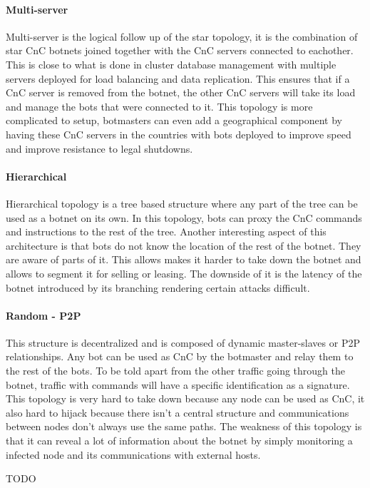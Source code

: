 \paragraph{Multi-server}
Multi-server is the logical follow up of the star topology, it is the combination of star CnC botnets joined together with the CnC servers connected to eachother. This is close to what is done in cluster database management with multiple servers deployed for load balancing and data replication. This ensures that if a CnC server is removed from the botnet, the other CnC servers will take its load and manage the bots that were connected to it. This topology is more complicated to setup, botmasters can even add a geographical component by having these CnC servers in the countries with bots deployed to improve speed and improve resistance to legal shutdowns.

\paragraph{Hierarchical}
Hierarchical topology is a tree based structure where any part of the tree can be used as a botnet on its own. In this topology, bots can proxy the CnC commands and instructions to the rest of the tree. Another interesting aspect of this architecture is that bots do not know the location of the rest of the botnet. They are aware of parts of it. This allows makes it harder to take down the botnet and allows to segment it for selling or leasing. The downside of it is the latency of the botnet introduced by its branching rendering certain attacks difficult.

\paragraph{Random - P2P}
This structure is decentralized and is composed of dynamic master-slaves or P2P relationships. Any bot can be used as CnC by the botmaster and relay them to the rest of the bots. To be told apart from the other traffic going through the botnet, traffic with commands will have a specific identification as a signature. This topology is very hard to take down because any node can be used as CnC, it also hard to hijack because there isn't a central structure and communications between nodes don't always use the same paths. The weakness of this topology is that it can reveal a lot of information about the botnet by simply monitoring a infected node and its communications with external hosts.

TODO
